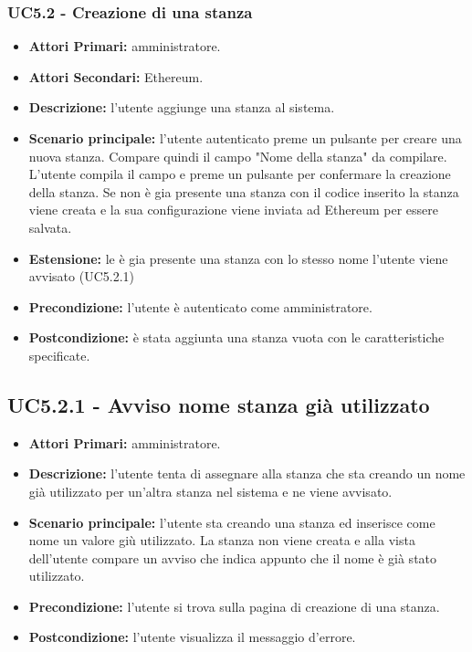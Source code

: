 \subsubsection{ UC5.2 - Creazione di una stanza}
\begin{itemize}
	\item\textbf{Attori Primari:}
	amministratore.
	\item\textbf{Attori Secondari:}
	Ethereum.
	\item\textbf{Descrizione:} 
	l'utente aggiunge una stanza al sistema.
	\item\textbf{Scenario principale:} 
	l'utente autenticato preme un pulsante per creare una nuova stanza. Compare quindi il campo "Nome della stanza" da compilare.
	L'utente compila il campo e preme un pulsante per confermare la creazione della stanza.
	Se non è gia presente una stanza con il codice inserito la stanza viene creata e la sua configurazione viene inviata ad Ethereum per essere salvata.
	\item\textbf{Estensione:}
	le è gia presente una stanza con lo stesso nome l'utente viene avvisato (UC5.2.1)
	\item\textbf{Precondizione:} 
	l'utente è autenticato come amministratore.
	\item\textbf{Postcondizione:}
	è stata aggiunta una stanza vuota con le caratteristiche specificate.
\end{itemize}

\subsection{ UC5.2.1 - Avviso nome stanza già utilizzato}
\begin{itemize}
	\item\textbf{Attori Primari:}
	amministratore.
	\item\textbf{Descrizione:}
	l'utente tenta di assegnare alla stanza che sta creando un nome già utilizzato per un'altra stanza nel sistema e ne viene avvisato.
	\item\textbf{Scenario principale:}
	l'utente sta creando una stanza ed inserisce come nome un valore giù utilizzato.
	La stanza non viene creata e alla vista dell'utente compare un avviso che indica appunto che il nome è già stato utilizzato.
	\item\textbf{Precondizione:}
	l'utente si trova sulla pagina di creazione di una stanza.
	\item\textbf{Postcondizione:}
	l'utente visualizza il messaggio d'errore.
\end{itemize}

